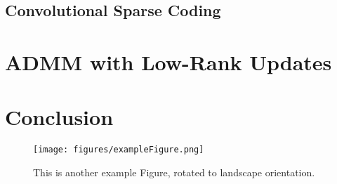 \subsection{Convolutional Sparse Coding}
\section{ADMM with Low-Rank Updates}
\section{Conclusion}

\begin{sidewaysfigure}
\texttt{[image: figures/exampleFigure.png]}
\caption{This is another example Figure, rotated to landscape orientation.}
\label{LandscapeFigure}
\end{sidewaysfigure}
